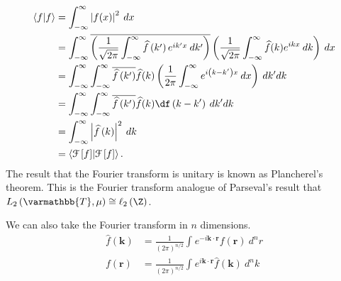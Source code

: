 \documentclass[10pt]{mypackage}
\renewcommand*{\mathbb}[1]{\varmathbb{#1}}
\begin{document}
\begin{align*}
  \braket{f}{f} &= \int_{-\infty}^{\infty} \left\vert f(x) \right\vert^2\:dx\\
                &= \int_{-\infty}^{\infty} \overline{\left(\frac{1}{\sqrt{2\pi}}\int_{-\infty}^{\infty} \widehat{f}\left(k'\right)e^{ik'x}\:dk'\right)} \left(\frac{1}{\sqrt{2\pi}}\int_{-\infty}^{\infty} \widehat{f}(k)e^{ikx}\:dk\right)\:dx\\
                &= \int_{-\infty}^{\infty}\int_{-\infty}^{\infty} \overline{\widehat{f}\left(k'\right)}\widehat{f}(k)\left(\frac{1}{2\pi}\int_{-\infty}^{\infty}e^{i\left(k-k'\right)x}\:dx\right)\:dk' dk\\
                &= \int_{-\infty}^{\infty}\int_{-\infty}^{\infty} \overline{\widehat{f}\left(k'\right)}\widehat{f}(k)\df\left(k-k'\right)\:dk' dk\\
                &= \int_{-\infty}^{\infty} \left\vert \widehat{f}\left(k\right) \right\vert^2\:dk\\
                &= \braket{\mathcal{F}\left[f\right]}{\mathcal{F}\left[f\right]}.
\end{align*}
The result that the Fourier transform is unitary is known as Plancherel's theorem. This is the Fourier transform analogue of Parseval's result that $L_{2}\left(\mathbb{T},\mu\right)\cong \ell_2\left(\Z\right)$.\newline

We can also take the Fourier transform in $n$ dimensions.
\begin{align*}
  \widehat{f}\left(\mathbf{k}\right) &= \frac{1}{\left(2\pi\right)^{n/2}}\int_{}^{} e^{-i\mathbf{k}\cdot \mathbf{r}}f\left(\mathbf{r}\right)\:d^n r\\
  f\left(\mathbf{r}\right) &= \frac{1}{\left(2\pi\right)^{n/2}}\int_{}^{} e^{i\mathbf{k}\cdot \mathbf{r}}\widehat{f}\left(\mathbf{k}\right)\:d^n k
\end{align*}
\end{document}
